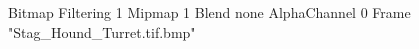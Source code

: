 {Bitmap
	{Filtering 1}
	{Mipmap 1}
	{Blend none}
	{AlphaChannel 0}
	{Frame "Stag_Hound_Turret.tif.bmp"}
}
